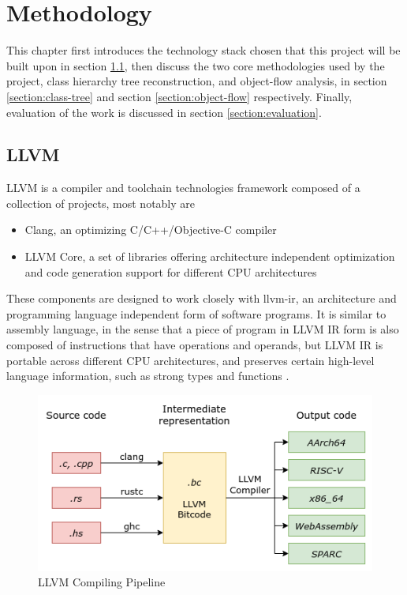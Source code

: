 \chapter{Methodology}
\label{chapter:methodology}

This chapter first introduces the technology stack chosen that this project will be built upon in section \ref{section:llvm}, then discuss the two core methodologies used by the project, class hierarchy tree reconstruction, and object-flow analysis, in section \ref{section:class-tree} and section \ref{section:object-flow} respectively. Finally, evaluation of the work is discussed in section \ref{section:evaluation}.

\section{LLVM}
\label{section:llvm}

LLVM is a compiler and toolchain technologies framework \cite{llvm-website} composed of a collection of projects, most notably are

\begin{itemize}
    \item Clang, an optimizing C/C++/Objective-C compiler
    \item LLVM Core, a set of libraries offering architecture independent optimization and code generation support for different CPU architectures
\end{itemize}

These components are designed to work closely with \ac{llvm-ir}, an architecture and programming language independent form of software programs. It is similar to assembly language, in the sense that a piece of program in LLVM IR form is also composed of instructions that have operations and operands, but LLVM IR is portable across different CPU architectures, and preserves certain high-level language information, such as strong types and functions \cite{llvm-ir}.

\begin{figure}[H]
    \centering
    \includegraphics[keepaspectratio,width=0.6\paperwidth]{img/llvm-compiler.png}
    \caption{LLVM Compiling Pipeline \cite{llvm-pipeline}}
    \label{fig:llvm-compiler}
\end{figure}

